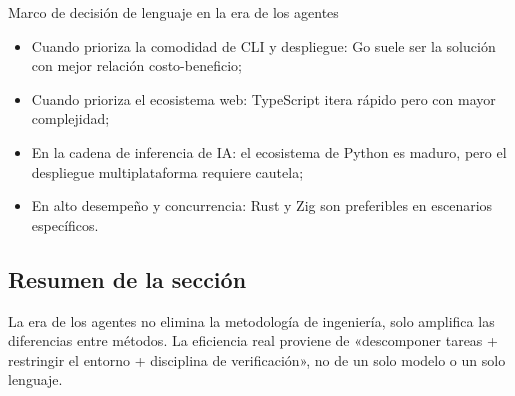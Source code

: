 \begin{importantbox}{Marco de decisión de lenguaje en la era de los agentes}
\begin{itemize}
    \item Cuando prioriza la comodidad de CLI y despliegue: Go suele ser la solución con mejor relación costo-beneficio;
    \item Cuando prioriza el ecosistema web: TypeScript itera rápido pero con mayor complejidad;
    \item En la cadena de inferencia de IA: el ecosistema de Python es maduro, pero el despliegue multiplataforma requiere cautela;
    \item En alto desempeño y concurrencia: Rust y Zig son preferibles en escenarios específicos.
\end{itemize}
\end{importantbox}

\subsection{Resumen de la sección}
La era de los agentes no elimina la metodología de ingeniería, solo amplifica las diferencias entre métodos. La eficiencia real proviene de «descomponer tareas + restringir el entorno + disciplina de verificación», no de un solo modelo o un solo lenguaje.

